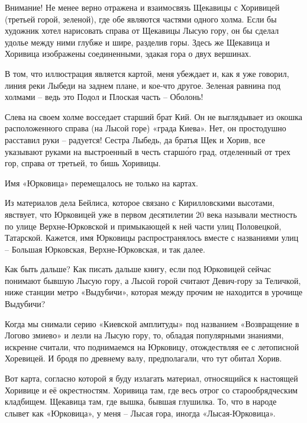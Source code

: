 Внимание! Не менее верно отражена и взаимосвязь Щекавицы с Хоривицей (третьей горой, зеленой), где обе являются частями одного холма. Если бы художник хотел нарисовать справа от Щекавицы Лысую гору, он бы сделал удолье между ними глубже и шире, разделив горы. Здесь же Щекавица и Хоривица изображены соединенными, эдакая гора о двух вершинах.

В том, что иллюстрация является картой, меня убеждает и, как я уже говорил, линия реки Лыбеди на заднем плане, и кое-что другое. Зеленая равнина под холмами – ведь это Подол и Плоская часть – Оболонь!

Слева на своем холме восседает старший брат Кий. Он не выглядывает из окошка расположенного справа (на Лысой горе) «града Киева». Нет, он простодушно расставил руки – радуется! Сестра Лыбедь, да братья Щек и Хорив, все указывают руками на выстроенный в честь старш\'ого град, отделенный от трех гор, справа от третьей, то бишь Хоривицы.

Имя «Юрковица» перемещалось не только на картах.

Из материалов дела Бейлиса, которое связано с Кирилловскими высотами, явствует, что Юрковицей уже в первом десятилетии 20 века называли местность по улице Верхне-Юрковской и примыкающей к ней части улиц Половецкой, Татарской. Кажется, имя Юрковицы распространялось вместе с названиями улиц – Большая Юрковская, Верхне-Юрковская, и так далее.

Как быть дальше? Как писать дальше книгу, если под Юрковицей сейчас понимают бывшую Лысую гору, а Лысой горой считают Девич-гору за Теличкой, ниже станции метро «Выдубичи», которая между прочим не находится в урочище Выдубичи?


Когда мы снимали серию «Киевской амплитуды» под названием «Возвращение в Логово змиево» и лезли на Лысую гору, то, обладая популярными знаниями, искренне считали, что поднимаемся на Юрковицу, отождествляя ее с летописной Хоревицей. И бродя по древнему валу, предполагали, что тут обитал Хорив.

Вот карта, согласно которой я буду излагать материал, относящийся к настоящей Хоривице и её окрестностям. Хоривица там, где весь отрог со старообрядческим кладбищем. Щекавица там, где вышка, бывшая глушилка. То, что в народе слывет как «Юрковица», у меня – Лысая гора, иногда «Лысая-Юрковица».

